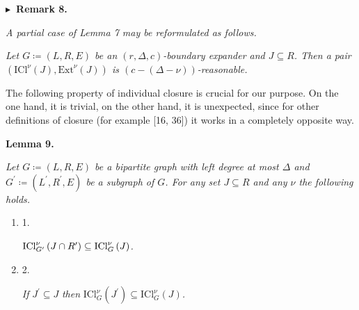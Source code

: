 \documentclass[10pt,a4paper]{article}
\begin{document}


\par\medskip\noindent\textbf{
$\blacktriangleright$ Remark 8.
}\par



\emph{A partial case of Lemma 7 may be reformulated as follows.}\par




\emph{Let $G\coloneqq(L,R,E)$ be an $(r,\Delta,c)$-boundary expander and $J\subseteq R$. Then a pair
$(\mathrm{ICl}^{\nu}\left(J\right),\mathrm{Ext}^{\nu}\left(J\right))$ is $(c-(\Delta-\nu))$-reasonable.}\par






The following property of individual closure is crucial for our purpose. On the one hand, it is trivial, on
the other hand, it is unexpected, since for other definitions of closure (for example
[16, 36]) it works in a completely opposite way.\par





\par\medskip\noindent\textbf{
\textbf{Lemma 9}\textbf{.}
}\par



\emph{Let $G\coloneqq(L,R,E)$ be a bipartite graph with left degree at most $\Delta$ and $G^{\prime}\coloneqq(L^{\prime},R^{\prime},E)$ be a subgraph of $G$. For any set $J\subseteq R$ and any $\nu$ the following holds.}\par


\begin{enumerate}


\item[] 
1. 


$\mathrm{ICl}_{G^{\prime}}^{\nu}\left(J\cap R^{\prime}\right)\subseteq\mathrm{%
ICl}_{G}^{\nu}\left(J\right)$\emph{.}\par





\item[] 
2. 


\emph{If }$J^{\prime}\subseteq J$\emph{ then }$\mathrm{ICl}_{G}^{\nu}\left(J^{\prime}\right)\subseteq\mathrm{ICl}_{G}^{\nu}%
\left(J\right)$\emph{.}\par





\end{enumerate}
\end{document}

